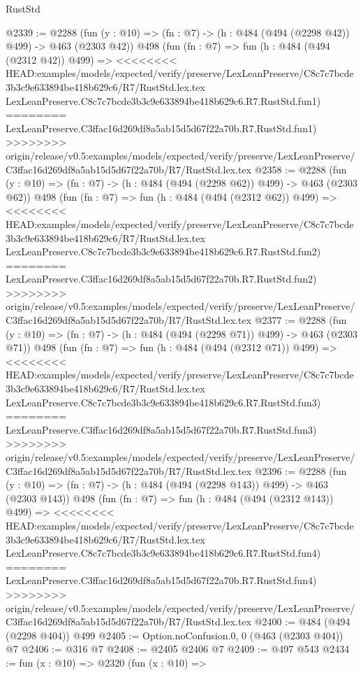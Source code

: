 \begin{lexlean}{RustStd}
\begin{coremodule}
{\begin{coremodule}
{{{{{{{{{@2339 := @2288
    (fun (y : @10) => (fn : @7) -> (h : @484 (@494 (@2298 @42)) @499) -> @463 (@2303 @42))
    @498
    (fun (fn : @7) =>
    fun (h : @484 (@494 (@2312 @42)) @499) =>
<<<<<<<< HEAD:examples/models/expected/verify/preserve/LexLeanPreserve/C8c7c7bcde3b3c9e633894be418b629c6/R7/RustStd.lex.tex
    LexLeanPreserve.C8c7c7bcde3b3c9e633894be418b629c6.R7.RustStd.fun1)
========
    LexLeanPreserve.C3ffac16d269df8a5ab15d5d67f22a70b.R7.RustStd.fun1)
>>>>>>>> origin/release/v0.5:examples/models/expected/verify/preserve/LexLeanPreserve/C3ffac16d269df8a5ab15d5d67f22a70b/R7/RustStd.lex.tex
@2358 := @2288
    (fun (y : @10) => (fn : @7) -> (h : @484 (@494 (@2298 @62)) @499) -> @463 (@2303 @62))
    @498
    (fun (fn : @7) =>
    fun (h : @484 (@494 (@2312 @62)) @499) =>
<<<<<<<< HEAD:examples/models/expected/verify/preserve/LexLeanPreserve/C8c7c7bcde3b3c9e633894be418b629c6/R7/RustStd.lex.tex
    LexLeanPreserve.C8c7c7bcde3b3c9e633894be418b629c6.R7.RustStd.fun2)
========
    LexLeanPreserve.C3ffac16d269df8a5ab15d5d67f22a70b.R7.RustStd.fun2)
>>>>>>>> origin/release/v0.5:examples/models/expected/verify/preserve/LexLeanPreserve/C3ffac16d269df8a5ab15d5d67f22a70b/R7/RustStd.lex.tex
@2377 := @2288
    (fun (y : @10) => (fn : @7) -> (h : @484 (@494 (@2298 @71)) @499) -> @463 (@2303 @71))
    @498
    (fun (fn : @7) =>
    fun (h : @484 (@494 (@2312 @71)) @499) =>
<<<<<<<< HEAD:examples/models/expected/verify/preserve/LexLeanPreserve/C8c7c7bcde3b3c9e633894be418b629c6/R7/RustStd.lex.tex
    LexLeanPreserve.C8c7c7bcde3b3c9e633894be418b629c6.R7.RustStd.fun3)
========
    LexLeanPreserve.C3ffac16d269df8a5ab15d5d67f22a70b.R7.RustStd.fun3)
>>>>>>>> origin/release/v0.5:examples/models/expected/verify/preserve/LexLeanPreserve/C3ffac16d269df8a5ab15d5d67f22a70b/R7/RustStd.lex.tex
@2396 := @2288
    (fun (y : @10) => (fn : @7) -> (h : @484 (@494 (@2298 @143)) @499) -> @463 (@2303 @143))
    @498
    (fun (fn : @7) =>
    fun (h : @484 (@494 (@2312 @143)) @499) =>
<<<<<<<< HEAD:examples/models/expected/verify/preserve/LexLeanPreserve/C8c7c7bcde3b3c9e633894be418b629c6/R7/RustStd.lex.tex
    LexLeanPreserve.C8c7c7bcde3b3c9e633894be418b629c6.R7.RustStd.fun4)
========
    LexLeanPreserve.C3ffac16d269df8a5ab15d5d67f22a70b.R7.RustStd.fun4)
>>>>>>>> origin/release/v0.5:examples/models/expected/verify/preserve/LexLeanPreserve/C3ffac16d269df8a5ab15d5d67f22a70b/R7/RustStd.lex.tex
@2400 := @484 (@494 (@2298 @404)) @499
@2405 := Option.noConfusion.{0, 0} (@463 (@2303 @404)) @7
@2406 := @316 @7
@2408 := @2405 @2406 @7
@2409 := @497 @543
@2434 := fun (x : @10) =>
  @2320
    (fun (x : @10) =>
}}}}}}}}}
\end{coremodule}}
\end{coremodule}
\end{lexlean}
